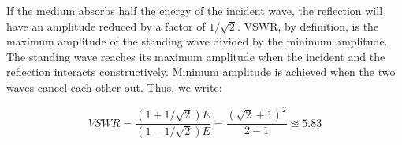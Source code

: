\documentclass{article}
\begin{document}
If the medium absorbs half the energy of the incident wave, the 
reflection will have an amplitude reduced by a factor of $1/\sqrt{2}$. 
VSWR, by definition, is the maximum amplitude of the standing wave 
divided by the minimum amplitude. The standing wave reaches its 
maximum amplitude when the incident and the reflection interacts 
constructively. Minimum amplitude is achieved when the two waves 
cancel each other out. Thus, we write:

\[
    \boxed{
    VSWR = \frac{(1+1/\sqrt{2})E}{(1-1/\sqrt{2})E}
    = \frac{(\sqrt{2}+1)^2}{2-1} \approxeq 5.83
    }
\]
\end{document}
